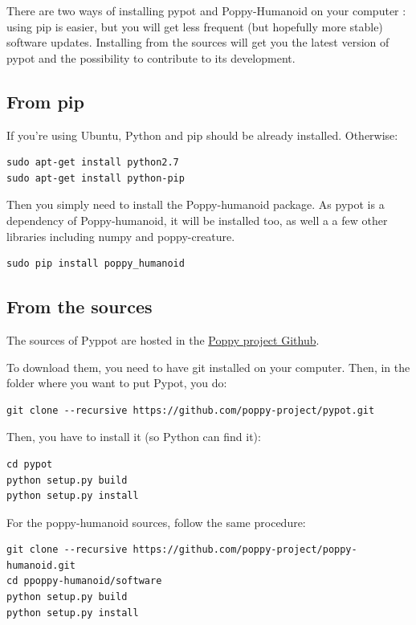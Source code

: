 \documentclass{article}
\begin{document}
There are two ways of installing pypot and Poppy-Humanoid on your computer : using pip is easier, but you will get less frequent (but hopefully more stable) software updates. Installing from the sources will get you the latest version of pypot and the possibility to contribute to its development.

\subsection{From pip}
If you're using Ubuntu, Python and pip should be already installed. Otherwise:
\begin{verbatim}
sudo apt-get install python2.7
sudo apt-get install python-pip
\end{verbatim}

Then you simply need to install the Poppy-humanoid package. As pypot is a dependency of Poppy-humanoid, it will be installed too, as well a a few other libraries including numpy and poppy-creature.

\begin{verbatim}
sudo pip install poppy_humanoid
\end{verbatim}

\subsection{From the sources}

The sources of Pyppot are hosted in the \href{https://github.com/poppy-project/pypot}{Poppy project Github}.

To download them, you need to have git installed on your computer. Then, in the folder where you want to put Pypot, you do:

\begin{verbatim}
git clone --recursive https://github.com/poppy-project/pypot.git
\end{verbatim}

Then, you have to install it (so Python can find it):

\begin{verbatim}
cd pypot
python setup.py build
python setup.py install
\end{verbatim}

For the poppy-humanoid sources, follow the same procedure:

\begin{verbatim}
git clone --recursive https://github.com/poppy-project/poppy-humanoid.git
cd ppoppy-humanoid/software
python setup.py build
python setup.py install
\end{verbatim}
\end{document}
